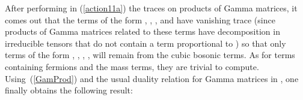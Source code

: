 \documentclass[a4paper,11pt]{article}
\def\Id{{\rm 1\kern-.28em I}}
\begin{document}
After performing in (\ref{action11a}) the traces on products of
Gamma matrices, it comes out that the terms of the form \coordHE{},
\coordHE{}, \coordHE{}, \coordHE{} and \coordHE{} have vanishing trace (since products of Gamma matrices related to these terms 
have decomposition in irreducible tensors that do not contain a term proportional to \myHighlight{$\Id_{32}$}\coordHE{}) 
so that only terms of the form \coordHE{}, \coordHE{}, \coordHE{}, \coordHE{}, \coordHE{} will remain
from the cubic bosonic terms. As for  terms containing fermions and the mass terms,
they are trivial to compute. Using~(\ref{GamProd}) and the usual duality relation for Gamma matrices in \coordHE{}, 
one finally obtains the following result:
\end{document}
